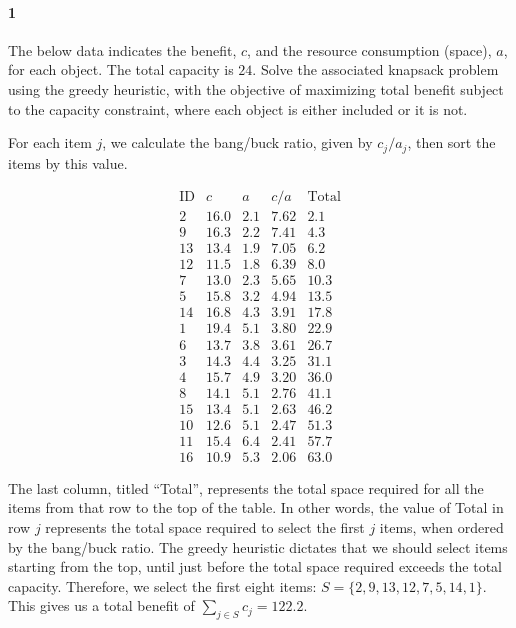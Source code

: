 \documentclass[12pt]{article}
\newenvironment{fullbox}{\begin{lrbox}{\savefullbox}\begin{minipage}{\dimexpr\textwidth-2\fboxsep\relax}}{\end{minipage}\end{lrbox}\begin{center}\framebox[\textwidth]{\usebox{\savefullbox}}\end{center}}
\newenvironment{pbox}[1][]{\begin{fullbox}\ifx#1\empty\else\paragraph{#1}\fi}{\end{fullbox}}
\theoremstyle{definition}
\begin{document}
\thispagestyle{title}


\begin{pbox}[1]
    The below data indicates the benefit, $c$, and the resource consumption (space), $a$, for each object. The total capacity is $24$. Solve the associated knapsack problem using the greedy heuristic, with the objective of maximizing total benefit subject to the capacity constraint, where each object is either included or it is not.
\end{pbox}

For each item $j$, we calculate the bang/buck ratio, given by $c_j/a_j$, then sort the items by this value.

\[\begin{array}{r*{4}{|r}}
    \text{ID} & c    & a   & c/a  & \text{Total} \\
    \hline
    2  & 16.0 & 2.1 & 7.62 & 2.1   \\
    9  & 16.3 & 2.2 & 7.41 & 4.3   \\
    13 & 13.4 & 1.9 & 7.05 & 6.2   \\
    12 & 11.5 & 1.8 & 6.39 & 8.0   \\
    7  & 13.0 & 2.3 & 5.65 & 10.3  \\
    5  & 15.8 & 3.2 & 4.94 & 13.5  \\
    14 & 16.8 & 4.3 & 3.91 & 17.8  \\
    1  & 19.4 & 5.1 & 3.80 & 22.9  \\
    6  & 13.7 & 3.8 & 3.61 & 26.7  \\
    3  & 14.3 & 4.4 & 3.25 & 31.1  \\
    4  & 15.7 & 4.9 & 3.20 & 36.0  \\
    8  & 14.1 & 5.1 & 2.76 & 41.1  \\
    15 & 13.4 & 5.1 & 2.63 & 46.2  \\
    10 & 12.6 & 5.1 & 2.47 & 51.3  \\
    11 & 15.4 & 6.4 & 2.41 & 57.7  \\
    16 & 10.9 & 5.3 & 2.06 & 63.0
\end{array}\]

The last column, titled ``Total'', represents the total space required for all the items from that row to the top of the table. In other words, the value of Total in row $j$ represents the total space required to select the first $j$ items, when ordered by the bang/buck ratio. The greedy heuristic dictates that we should select items starting from the top, until just before the total space required exceeds the total capacity. Therefore, we select the first eight items: $S = \{2, 9, 13, 12, 7, 5, 14, 1\}$. This gives us a total benefit of $\sum_{j \in S} c_j = 122.2$.
\end{document}
